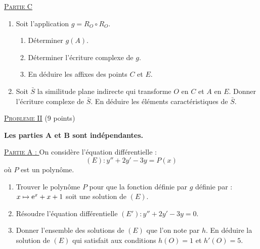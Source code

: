      \noindent \underline{\textsc{Partie C}}%
      \begin{enumerate}
            \item Soit l'application $g = R_O \circ R_O$.
                  \begin{enumerate}
                        \item D\'eterminer $g(A)$.
                        \item D\'eterminer l'\'ecriture complexe de $g$.
                        \item En d\'eduire les affixes des points $C$ et $E$.
                  \end{enumerate}
            \item Soit $\bar{S}$ la similitude plane indirecte qui transforme $O$ en $C$ et $A$ en $E$.
                  Donner l'\'ecriture complexe de $\bar{S}$.
                  En d\'eduire les \'el\'ements caract\'eristiques de $\bar{S}$.
      \end{enumerate}
%
\noindent \underline{\textsc{Probleme II}} (9 points)%
      \begin{center}
            \textbf{Les parties A et B sont ind\'ependantes.}
      \end{center}
      \noindent \underline{\textsc{Partie A} : }%
            On consid\`ere l'\'equation diff\'erentielle :
            \begin{equation*}
                  (E) : y'' + 2 y' - 3 y = P(x)
            \label{eq:diff2015}
            \end{equation*}
            o\`u $P$ est un polyn\^ome.
            \begin{enumerate}
                  \item Trouver le polyn\^ome $P$ pour que la fonction d\'efinie par $g$ d\'efinie par : 
                  $x \mapsto \mathrm{e}^{x} + x + 1$ soit une solution de $(E)$.
                  \item R\'esoudre l'\'equation diff\'erentielle 
                        $(E') : y'' + 2 y' - 3y = 0$.
                  \item Donner l'ensemble des solutions de $(E)$ que l'on note par $h$.
                        En d\'eduire la solution de $(E)$ qui satisfait aux conditions $h(O) = 1$ et $h'(O) = 5$.
            \end{enumerate}
